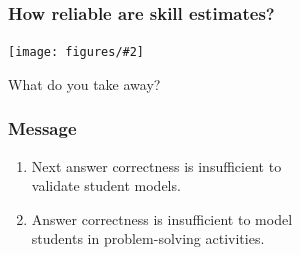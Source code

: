 \documentclass[bigger]{beamer}
\newcommand{\img}[2]{
  \begin{center}
    \texttt{[image: figures/\#2]}
  \end{center}
}
\begin{document}
\begin{frame}
  \frametitle{How reliable are skill estimates?}
  \bigskip
  \img{0.9}{reliability-skills}
\end{frame}

\begin{frame}[standout]
What do you take away?
\end{frame}

\begin{frame}
\frametitle{Message}
\begin{enumerate}
\item Next answer correctness is insufficient to\\validate student models.
\bigskip
\item Answer correctness is insufficient to model\\students in problem-solving activities.
\end{enumerate}
\end{frame}
\end{document}
